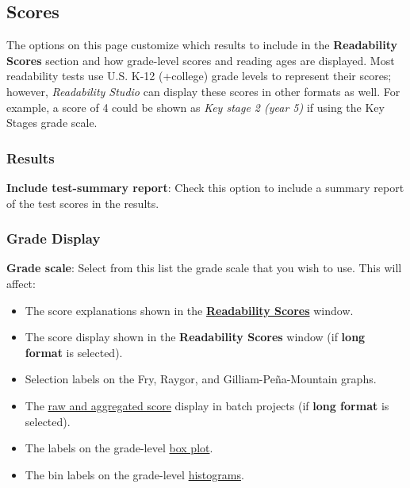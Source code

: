 \documentclass[
]{book}
\providecommand{\tightlist}{%
  \setlength{\itemsep}{0pt}\setlength{\parskip}{0pt}}
\theoremstyle{definition}
\theoremstyle{definition}
\theoremstyle{definition}
\theoremstyle{definition}
\theoremstyle{remark}
\begin{document}
\hypertarget{options-scores}{%
\subsection*{Scores}\label{options-scores}}

The options on this page customize which results to include in the \textbf{Readability Scores} section and how grade-level scores and reading ages are displayed. Most readability tests use U.S. K-12 (+college) grade levels to represent their scores; however, \emph{Readability Studio} can display these scores in other formats as well. For example, a score of 4 could be shown as \emph{Key stage 2 (year 5)} if using the Key Stages grade scale.

\hypertarget{options-results-options}{%
\subsubsection*{Results}\label{options-results-options}}

\textbf{Include test-summary report}: Check this option to include a summary report of the test scores in the results.

\hypertarget{grade-display}{%
\subsubsection*{Grade Display}\label{grade-display}}

\textbf{Grade scale}: Select from this list the grade scale that you wish to use. This will affect:

\begin{itemize}
\tightlist
\item
  The score explanations shown in the \protect\hyperlink{reviewing-test-scores}{\textbf{Readability Scores}} window.
\item
  The score display shown in the \textbf{Readability Scores} window (if \textbf{long format} is selected).
\item
  Selection labels on the Fry, Raygor, and Gilliam-Peña-Mountain graphs.
\item
  The \protect\hyperlink{reviewing-batch-scores}{raw and aggregated score} display in batch projects (if \textbf{long format} is selected).
\item
  The labels on the grade-level \protect\hyperlink{reviewing-batch-box-plots}{box plot}.
\item
  The bin labels on the grade-level \protect\hyperlink{reviewing-batch-histograms}{histograms}.
\end{itemize}
\end{document}
